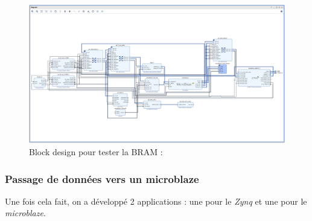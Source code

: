 \documentclass[12pt,a4paper]{article}
\begin{document}
\begin{figure}[H]
	\centering
	\includegraphics[width=\linewidth]{im/bram1.png}	
	\caption{Block design pour tester la BRAM :}
	\label{fig-bram1}
\end{figure}


\subsubsection{Passage de données vers un microblaze}
Une fois cela fait, on a développé 2 applications : une pour le \textit{Zynq} et une pour le \textit{microblaze}.
\end{document}
